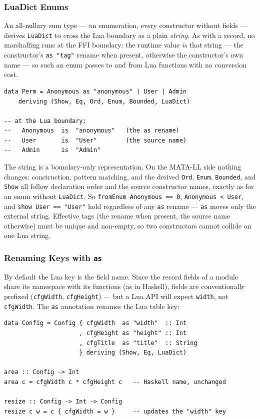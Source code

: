 \documentclass[11pt,a4paper]{article}
\begin{document}
\subsubsection{LuaDict Enums}
\label{sec:luadictenum}

An all-nullary sum type --- an enumeration, every constructor without
fields --- derives \texttt{LuaDict} to cross the Lua boundary as a
plain \emph{string}.  As with a record, no marshalling runs at the FFI
boundary: the runtime value \emph{is} that string --- the
constructor's \texttt{as "tag"} rename when present, otherwise the
constructor's own name --- so such an enum passes to and from Lua
functions with no conversion cost.

\begin{lstlisting}
data Perm = Anonymous as "anonymous" | User | Admin
    deriving (Show, Eq, Ord, Enum, Bounded, LuaDict)

-- at the Lua boundary:
--   Anonymous  is  "anonymous"   (the as rename)
--   User       is  "User"        (the source name)
--   Admin      is  "Admin"
\end{lstlisting}

The string is a boundary-only representation.  On the MATA-LL side
nothing changes: construction, pattern matching, and the derived
\texttt{Ord}, \texttt{Enum}, \texttt{Bounded}, and \texttt{Show} all
follow declaration order and the source constructor names, exactly as
for an enum without \texttt{LuaDict}.  So \texttt{fromEnum Anonymous ==
0}, \texttt{Anonymous < User}, and \texttt{show User == "User"} hold
regardless of any \texttt{as} rename --- \texttt{as} moves only the
external string.  Effective tags (the rename when present, the source
name otherwise) must be unique and non-empty, so two constructors
cannot collide on one Lua string.

\subsubsection{Renaming Keys with \texttt{as}}
\label{sec:asrename}

By default the Lua key is the field name.  Since the record fields of a
module share its namespace with its functions (as in Haskell), fields are
conventionally prefixed (\texttt{cfgWidth}, \texttt{cfgHeight}) --- but
a Lua API will expect \texttt{width}, not \texttt{cfgWidth}.  The
\texttt{as} annotation renames the Lua table key:

\begin{lstlisting}
data Config = Config { cfgWidth  as "width"  :: Int
                     , cfgHeight as "height" :: Int
                     , cfgTitle  as "title"  :: String
                     } deriving (Show, Eq, LuaDict)

area :: Config -> Int
area c = cfgWidth c * cfgHeight c   -- Haskell name, unchanged

resize :: Config -> Int -> Config
resize c w = c { cfgWidth = w }     -- updates the "width" key
\end{lstlisting}
\end{document}
